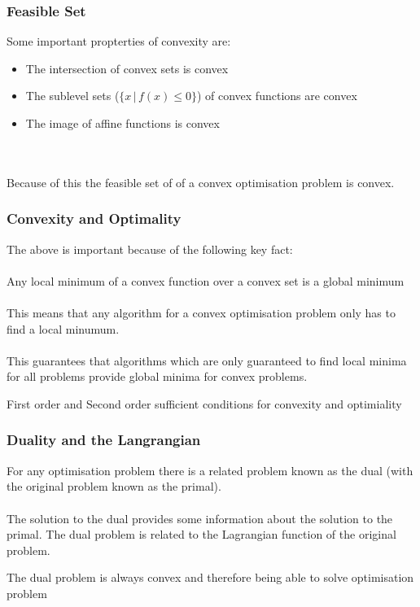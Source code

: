 \documentclass{beamer}
\begin{document}
\begin{frame}
    \frametitle{Feasible Set}
    Some important propterties of convexity are:
    \begin{itemize}
        \item The intersection of convex sets is convex
        \item The sublevel sets ($\{x \, | \, f(x) \leq 0 \}$) of convex
            functions are convex
        \item The image of affine functions is convex
    \end{itemize}
    \\~\\
    Because of this the feasible set of of a convex optimisation problem is
    convex.
\end{frame}

\begin{frame}
    \frametitle{Convexity and Optimality}
    The above is important because of the following key fact:
    \\~\\
    Any local minimum of a convex function over a convex set is a global
    minimum
    \\~\\
    This means that any algorithm for a convex optimisation problem only has to
    find a local minumum.
    \\~\\
    This guarantees that algorithms which are only
    guaranteed to find local minima for all problems provide global minima for
    convex problems.
\end{frame}

\begin{frame}
    First order and Second order sufficient conditions for convexity and
    optimiality
\end{frame}


\begin{frame}
    \frametitle{Duality and the Langrangian}
    For any optimisation problem there is a related problem known as the dual
    (with the original problem known as the primal).
    \\~\\
    The solution to the dual provides some information about the solution to the
    primal. The dual problem is related to the Lagrangian function of the
    original problem.

    The dual problem is always convex and therefore being able to solve
    optimisation problem  
\end{frame}
\end{document}

